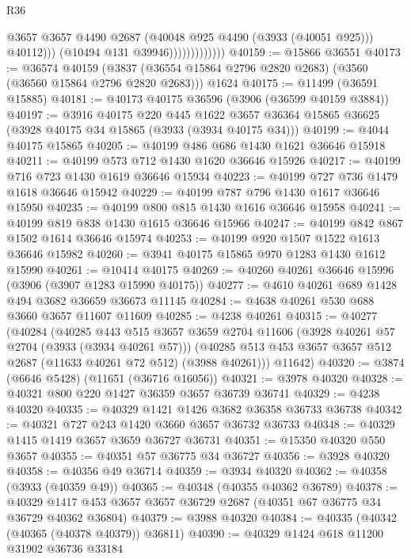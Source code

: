 \begin{lexlean}{R36}
\begin{coremodule}
                                  @3657
                                  @3657
                                  @4490
                                  @2687
                                  (@40048 @925 @4490 (@3933 (@40051 @925)))
                                  @40112)))
                            (@10494 @131 @39946)))))))))))))
@40159 := @15866 @36551
@40173 := @36574
    @40159
    (@3837 (@36554 @15864 @2796 @2820 @2683) (@3560 (@36560 @15864 @2796 @2820 @2683)))
    @1624
@40175 := @11499 (@36591 @15885)
@40181 := @40173 @40175 @36596 (@3906 (@36599 @40159 @3884))
@40197 := @3916
    @40175
    @220
    @445
    @1622
    @3657
    @36364
    @15865
    @36625
    (@3928 @40175 @34 @15865 (@3933 (@3934 @40175 @34)))
@40199 := @4044 @40175 @15865
@40205 := @40199 @486 @686 @1430 @1621 @36646 @15918
@40211 := @40199 @573 @712 @1430 @1620 @36646 @15926
@40217 := @40199 @716 @723 @1430 @1619 @36646 @15934
@40223 := @40199 @727 @736 @1479 @1618 @36646 @15942
@40229 := @40199 @787 @796 @1430 @1617 @36646 @15950
@40235 := @40199 @800 @815 @1430 @1616 @36646 @15958
@40241 := @40199 @819 @838 @1430 @1615 @36646 @15966
@40247 := @40199 @842 @867 @1502 @1614 @36646 @15974
@40253 := @40199 @920 @1507 @1522 @1613 @36646 @15982
@40260 := @3941 @40175 @15865 @970 @1283 @1430 @1612 @15990
@40261 := @10414 @40175
@40269 := @40260 @40261 @36646 @15996 (@3906 (@3907 @1283 @15990 @40175))
@40277 := @4610 @40261 @689 @1428 @494 @3682 @36659 @36673 @11145
@40284 := @4638 @40261 @530 @688 @3660 @3657 @11607 @11609
@40285 := @4238 @40261
@40315 := @40277
    (@40284
      (@40285
        @443
        @515
        @3657
        @3659
        @2704
        @11606
        (@3928 @40261 @57 @2704 (@3933 (@3934 @40261 @57)))
        (@40285 @513 @453 @3657 @3657 @512 @2687 (@11633 @40261 @72 @512) (@3988 @40261)))
      @11642)
@40320 := @3874 (@6646 @5428) (@11651 (@36716 @16056))
@40321 := @3978 @40320
@40328 := @40321 @800 @220 @1427 @36359 @3657 @36739 @36741
@40329 := @4238 @40320
@40335 := @40329 @1421 @1426 @3682 @36358 @36733 @36738
@40342 := @40321 @727 @243 @1420 @3660 @3657 @36732 @36733
@40348 := @40329 @1415 @1419 @3657 @3659 @36727 @36731
@40351 := @15350 @40320 @550 @3657
@40355 := @40351 @57 @36775 @34 @36727
@40356 := @3928 @40320
@40358 := @40356 @49 @36714
@40359 := @3934 @40320
@40362 := @40358 (@3933 (@40359 @49))
@40365 := @40348 (@40355 @40362 @36789)
@40378 := @40329 @1417 @453 @3657 @3657 @36729 @2687 (@40351 @67 @36775 @34 @36729 @40362 @36804)
@40379 := @3988 @40320
@40384 := @40335 (@40342 (@40365 (@40378 @40379)) @36811)
@40390 := @40329 @1424 @618 @11200 @31902 @36736 @33184

\end{coremodule}
\end{lexlean}
